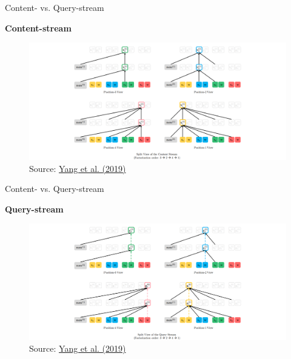 
\begin{frame}{Content- vs. Query-stream}

\vfill

	\textbf{Content-stream}
	
	\begin{figure}
		\centering
		\hspace{-2cm}\includegraphics[width = 13cm]{figure/xlnet-content.png}\\ 
		{\footnotesize Source: \href{https://papers.nips.cc/paper/8812-xlnet-generalized-autoregressive-pretraining-for-language-understanding.pdf}{Yang et al. (2019)}}
	\end{figure}
	
\vfill

\end{frame}


\begin{frame}{Content- vs. Query-stream}

\vfill

	\textbf{Query-stream}
	
	\begin{figure}
		\centering
		\hspace{-2cm}\includegraphics[width = 13cm]{figure/xlnet-query.png}\\ 
		{\footnotesize Source: \href{https://papers.nips.cc/paper/8812-xlnet-generalized-autoregressive-pretraining-for-language-understanding.pdf}{Yang et al. (2019)}}
	\end{figure}
	
\vfill

\end{frame}

